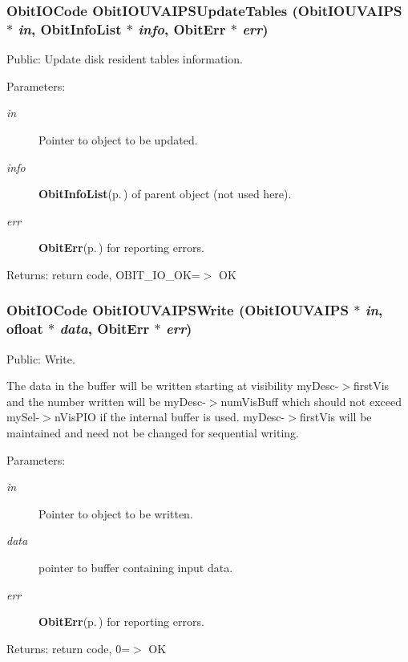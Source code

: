 \subsubsection{\setlength{\rightskip}{0pt plus 5cm}Obit\-IOCode Obit\-IOUVAIPSUpdate\-Tables ({\bf Obit\-IOUVAIPS} $\ast$ {\em in}, {\bf Obit\-Info\-List} $\ast$ {\em info}, {\bf Obit\-Err} $\ast$ {\em err})}\label{ObitIOUVAIPS_8c_a31}


Public: Update disk resident tables information. 

\begin{Desc}
\item[Parameters:]
\begin{description}
\item[{\em in}]Pointer to object to be updated. \item[{\em info}]{\bf Obit\-Info\-List}{\rm (p.\,\pageref{structObitInfoList})} of parent object (not used here). \item[{\em err}]{\bf Obit\-Err}{\rm (p.\,\pageref{structObitErr})} for reporting errors. \end{description}
\end{Desc}
\begin{Desc}
\item[Returns:]return code, OBIT\_\-IO\_\-OK=$>$ OK \end{Desc}
\subsubsection{\setlength{\rightskip}{0pt plus 5cm}Obit\-IOCode Obit\-IOUVAIPSWrite ({\bf Obit\-IOUVAIPS} $\ast$ {\em in}, {\bf ofloat} $\ast$ {\em data}, {\bf Obit\-Err} $\ast$ {\em err})}\label{ObitIOUVAIPS_8c_a25}


Public: Write. 

The data in the buffer will be written starting at visibility my\-Desc-$>$first\-Vis and the number written will be my\-Desc-$>$num\-Vis\-Buff which should not exceed my\-Sel-$>$n\-Vis\-PIO if the internal buffer is used. my\-Desc-$>$first\-Vis will be maintained and need not be changed for sequential writing. \begin{Desc}
\item[Parameters:]
\begin{description}
\item[{\em in}]Pointer to object to be written. \item[{\em data}]pointer to buffer containing input data. \item[{\em err}]{\bf Obit\-Err}{\rm (p.\,\pageref{structObitErr})} for reporting errors. \end{description}
\end{Desc}
\begin{Desc}
\item[Returns:]return code, 0=$>$ OK \end{Desc}
